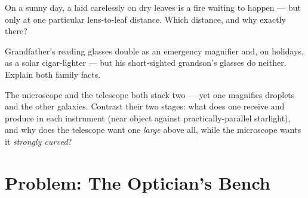 \begin{exercise}[$\star\star$]\label{exo:g8:lenses-images:10}
On a sunny day, a  laid carelessly on dry leaves is a
fire waiting to happen --- but only at one particular
lens-to-leaf distance. Which distance, and why exactly
there?
\end{exercise}

\begin{exercise}[$\star\star$]\label{exo:g8:lenses-images:11}
Grandfather's reading glasses double as an emergency
magnifier and, on holidays, as a solar cigar-lighter ---
but his short-sighted grandson's glasses do neither. Explain
both family facts.
\end{exercise}

\begin{exercise}[$\star\star\star$]\label{exo:g8:lenses-images:12}
The microscope and the telescope both stack two  --- yet one magnifies droplets and the other
galaxies. Contrast their two stages: what does  one
receive and produce in each instrument (near object against
practically-parallel starlight), and why does the telescope
want  one \emph{large} above all, while the microscope
wants it \emph{strongly curved}?
\end{exercise}

\section{Problem: The Optician's Bench}

